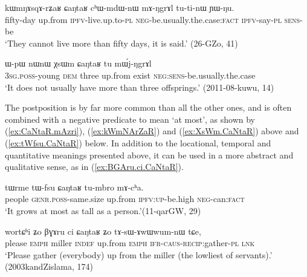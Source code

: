 \begin{exe}
\ex \label{ex:kWmNArZaR}
 \gll kɯmŋɤsqɤ-rʑaʁ ɕaŋtaʁ cʰɯ-mdɯ-nɯ mɤ-ŋgrɤl tu-ti-nɯ ɲɯ-ŋu.  \\
 fifty-day up.from \textsc{ipfv}-live.up.to-\textsc{pl} \textsc{neg}-be.usually.the.case:\textsc{fact} \textsc{ipfv}-say-\textsc{pl} \textsc{sens}-be \\
\glt `They cannot live more than fifty days, it is said.' (26-GZo, 41)
\end{exe}

\begin{exe}
\ex \label{ex:XsWm.CaNtaR}
 \gll ɯ-pɯ nɯnɯ χsɯm ɕaŋtaʁ tu mɯ́j-ŋgrɤl \\
\textsc{3sg}.\textsc{poss}-young \textsc{dem} three up.from exist \textsc{neg}:\textsc{sens}-be.usually.the.case \\
\glt  `It does not usually have more than three offsprings.' (2011-08-kuwu, 14)
\end{exe}

The postposition   is by far more common than all the other ones, and is often combined with a negative predicate to mean `at most', as shown by (\ref{ex:CaNtaR.mAzri}), (\ref{ex:kWmNArZaR}) and (\ref{ex:XsWm.CaNtaR}) above and (\ref{ex:tWfsu.CaNtaR}) below. In addition to the locational, temporal and quantitative meanings presented above, it can be used in a more abstract and qualitative sense, as in (\ref{ex:BGAru.ci.CaNtaR}).

\begin{exe}
\ex \label{ex:tWfsu.CaNtaR}
 \gll tɯrme tɯ-fsu ɕaŋtaʁ tu-mbro mɤ-cʰa. \\
people \textsc{genr}.\textsc{poss}-same.size up.from \textsc{ipfv}:\textsc{up}-be.high \textsc{neg}-can:\textsc{fact} \\
\glt `It grows at most as tall as a person.'(11-qarGW, 29)
\end{exe}

 \begin{exe}
\ex \label{ex:BGAru.ci.CaNtaR}
 \gll  wortɕʰi ʑo βɣɤru ci ɕaŋtaʁ ʑo tɤ-sɯ-ɤwɯwum-nɯ tɕe, \\
 please \textsc{emph} miller \textsc{indef} up.from \textsc{emph} \textsc{ifr}-\textsc{caus}-\textsc{recip}:gather-\textsc{pl} \textsc{lnk} \\
\glt `Please gather (everybody) up from the miller (the lowliest of servants).' (2003kandZislama, 174)
\end{exe}

